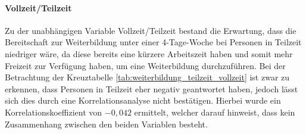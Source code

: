 


\paragraph*{Vollzeit/Teilzeit}

Zu der unabhängigen Variable Vollzeit/Teilzeit bestand die Erwartung, dass die Bereitschaft zur 
Weiterbildung unter einer 4-Tage-Woche bei Personen in Teilzeit niedriger wäre, da diese bereits
eine kürzere Arbeitszeit haben und somit mehr Freizeit zur Verfügung haben, um eine Weiterbildung
durchzuführen. Bei der Betrachtung der Kreuztabelle \ref{tab:weiterbildung_teilzeit_vollzeit} ist
zwar zu erkennen, dass Personen in Teilzeit eher negativ geantwortet haben, jedoch lässt sich
dies durch eine Korrelationsanalyse nicht bestätigen. Hierbei wurde ein Korrelationskoeffizient von $-0,042$
ermittelt, welcher darauf hinweist, dass kein Zusammenhang zwischen den beiden Variablen besteht.

